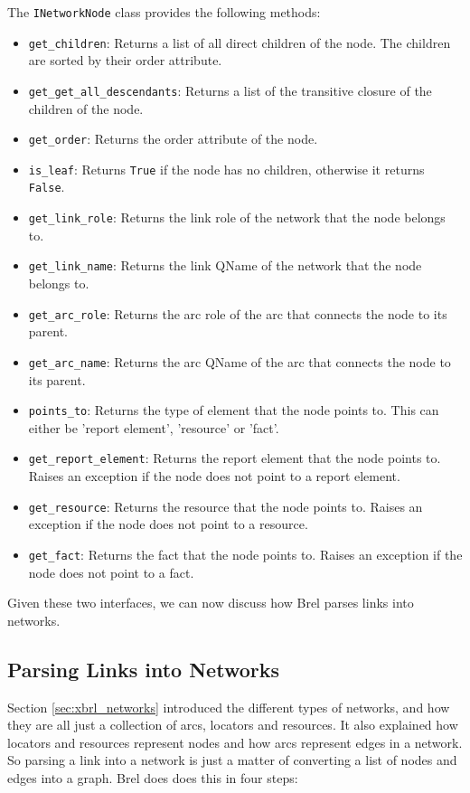 The \texttt{INetworkNode} class provides the following methods:

\begin{itemize}
    \item \texttt{get\_children}: Returns a list of all direct children of the node.
    The children are sorted by their order attribute.
    \item \texttt{get\_get\_all\_descendants}: Returns a list of the transitive closure of the children of the node.
    \item \texttt{get\_order}: Returns the order attribute of the node.
    \item \texttt{is\_leaf}: Returns \texttt{True} if the node has no children, otherwise it returns \texttt{False}.
    \item \texttt{get\_link\_role}: Returns the link role of the network that the node belongs to.
    \item \texttt{get\_link\_name}: Returns the link QName of the network that the node belongs to.
    \item \texttt{get\_arc\_role}: Returns the arc role of the arc that connects the node to its parent.
    \item \texttt{get\_arc\_name}: Returns the arc QName of the arc that connects the node to its parent.
    \item \texttt{points\_to}: Returns the type of element that the node points to.
    This can either be 'report element', 'resource' or 'fact'.
    \item \texttt{get\_report\_element}: Returns the report element that the node points to.
    Raises an exception if the node does not point to a report element.
    \item \texttt{get\_resource}: Returns the resource that the node points to.
    Raises an exception if the node does not point to a resource.
    \item \texttt{get\_fact}: Returns the fact that the node points to.
    Raises an exception if the node does not point to a fact.

\end{itemize}

Given these two interfaces, we can now discuss how Brel parses links into networks.

\subsection{Parsing Links into Networks}

Section \ref{sec:xbrl_networks} introduced the different types of networks, and how they are all just a collection of arcs, locators and resources.
It also explained how locators and resources represent nodes and how arcs represent edges in a network.
So parsing a link into a network is just a matter of converting a list of nodes and edges into a graph.
Brel does does this in four steps:


